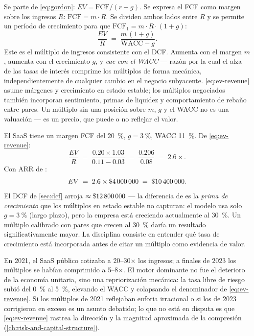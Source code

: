 Se parte de \cref{eq:gordon}: \(EV = \mathrm{FCF}/(r-g)\). Se expresa el FCF como margen sobre
los ingresos \(R\): \(\mathrm{FCF}=m\cdot R\). Se dividen ambos lados entre \(R\) y se permite un período
de crecimiento para que \(\mathrm{FCF}_1 = m\cdot R\cdot(1+g)\):
\begin{equation}\label{eq:ev-revenue}
  \frac{EV}{R} \;=\; \frac{m\,(1+g)}{\mathrm{WACC}-g}.
\end{equation}
Este es el múltiplo de ingresos consistente con el DCF. Aumenta con el margen \(m\), aumenta con el
crecimiento \(g\), y \emph{cae con el WACC} --- razón por la cual el alza de las tasas de interés
comprime los múltiplos de forma mecánica, independientemente de cualquier cambio en el negocio subyacente.
\cref{eq:ev-revenue} asume márgenes y crecimiento en estado estable; los múltiplos negociados también
incorporan sentimiento, primas de liquidez y comportamiento de rebaño entre pares. Un múltiplo sin una
posición sobre \(m\), \(g\) y el WACC no es una valuación --- es un precio, que puede o no reflejar el valor.

\begin{example}
El SaaS tiene un margen FCF del \qty{20}{\percent}, \(g=\qty{3}{\percent}\), WACC \qty{11}{\percent}.
De \cref{eq:ev-revenue}:
\[
  \frac{EV}{R} \;=\; \frac{0.20\times1.03}{0.11-0.03} \;=\; \frac{0.206}{0.08} \;=\; 2.6\times.
\]
Con ARR de :
\[
  EV \;=\; 2.6\times\$\num{4000000} \;=\; \$\num{10400000}.
\]
El DCF de \cref{sec:dcf} arroja \(\approx\$\num{12800000}\) --- la
diferencia de  es la \emph{prima de crecimiento} que los múltiplos en estado estable
no capturan: el modelo usa solo \(g=\qty{3}{\percent}\) (largo plazo), pero la empresa está creciendo
actualmente al \qty{30}{\percent}. Un múltiplo calibrado con pares que crecen al
\qty{30}{\percent} daría un resultado significativamente mayor. La disciplina consiste en entender
qué tasa de crecimiento está incorporada antes de citar un múltiplo como evidencia de valor.
\end{example}

En 2021, el SaaS público cotizaba a 20--30$\times$ los ingresos; a finales de 2023 los múltiplos se habían
comprimido a 5--8$\times$. El motor dominante no fue el deterioro de la economía unitaria, sino una
repriorización mecánica: la tasa libre de riesgo subió del \qty{0}{\percent} al \qty{5}{\percent},
elevando el WACC y colapsando el denominador de \cref{eq:ev-revenue}. Si los múltiplos de 2021
reflejaban euforia irracional o si los de 2023 corrigieron en exceso es un asunto debatido; lo que no
está en disputa es que \cref{eq:ev-revenue} rastrea la dirección y la magnitud aproximada de la
compresión (\cref{ch:risk-and-capital-structure}).

